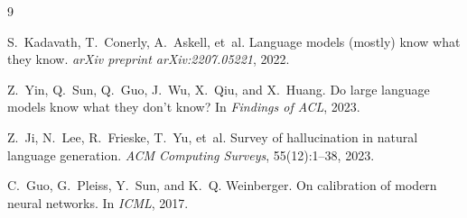 \documentclass[10pt,twocolumn]{article}
\begin{document}


\begin{thebibliography}{9}

S.~Kadavath, T.~Conerly, A.~Askell, et~al.
\newblock Language models (mostly) know what they know.
\newblock \textit{arXiv preprint arXiv:2207.05221}, 2022.

Z.~Yin, Q.~Sun, Q.~Guo, J.~Wu, X.~Qiu, and X.~Huang.
\newblock Do large language models know what they don't know?
\newblock In \textit{Findings of ACL}, 2023.

Z.~Ji, N.~Lee, R.~Frieske, T.~Yu, et~al.
\newblock Survey of hallucination in natural language generation.
\newblock \textit{ACM Computing Surveys}, 55(12):1--38, 2023.

C.~Guo, G.~Pleiss, Y.~Sun, and K.~Q. Weinberger.
\newblock On calibration of modern neural networks.
\newblock In \textit{ICML}, 2017.

\end{thebibliography}
\end{document}
